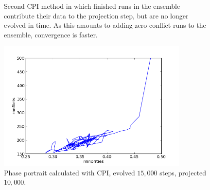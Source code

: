 \documentclass[11pt]{article}
\begin{document}
\begin{figure}[h!]
  \centering
  \hspace{3mm}
  \caption{Second CPI method in which finished runs in the ensemble contribute their data to the projection step, but are no longer evolved in time. As this amounts to adding zero conflict runs to the ensemble, convergence is faster.}
  \label{fig:vmFast}
\end{figure}

\begin{figure}[h!]
  \centering
  \includegraphics[height=65mm]{vmCPIPP}
  \caption{Phase portrait calculated with CPI, evolved $15,000$ steps, projected $10,000$.}
  \label{fig:vmCPIPP}
\end{figure}
\end{document}
